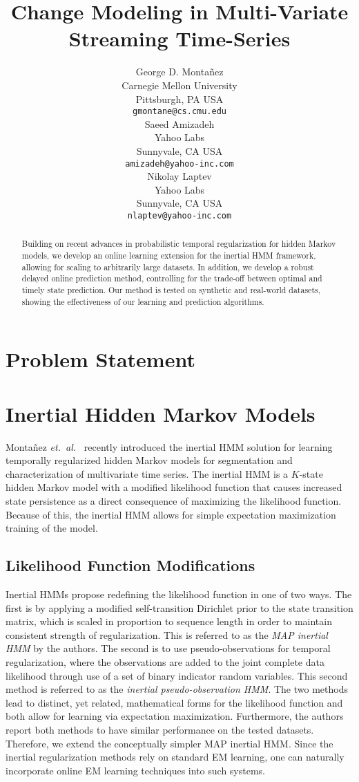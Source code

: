 \documentclass{article}
\title{Change Modeling in Multi-Variate Streaming Time-Series}
\author{George D. Monta\~nez \\
Carnegie Mellon University\\
Pittsburgh, PA USA\\
\texttt{gmontane@cs.cmu.edu} \\
\And
Saeed Amizadeh\\
Yahoo Labs\\
Sunnyvale, CA USA\\
\texttt{amizadeh@yahoo-inc.com}\\
\And
Nikolay Laptev\\
Yahoo Labs\\
Sunnyvale, CA USA\\
\texttt{nlaptev@yahoo-inc.com}}
\begin{document}
\maketitle

\begin{abstract}
Building on recent advances in probabilistic temporal regularization for hidden Markov models, we develop an online learning extension for the inertial HMM framework, allowing for scaling to arbitrarily large datasets. In addition, we develop a robust delayed online prediction method, controlling for the trade-off between optimal and timely state prediction. Our method is tested on synthetic and real-world datasets, showing the effectiveness of our learning and prediction algorithms.
\end{abstract}



\section{Problem Statement}

\section{Inertial Hidden Markov Models}

Monta\~nez \emph{et.\ al.}~ recently introduced the inertial HMM solution for learning temporally regularized hidden Markov models for segmentation and characterization of multivariate time series. The inertial HMM is a $K$-state hidden Markov model with a modified likelihood function that causes increased state persistence as a direct consequence of maximizing the likelihood function. Because of this, the inertial HMM allows for simple expectation maximization~\cite{dempster1977maximum} training of the model.

\subsection{Likelihood Function Modifications}
Inertial HMMs propose redefining the likelihood function in one of two ways. The first is by applying a modified self-transition Dirichlet prior to the state transition matrix, which is scaled in proportion to sequence length in order to maintain consistent strength of regularization. This is referred to as the \emph{MAP inertial HMM} by the authors. The second is to use pseudo-observations for temporal regularization, where the observations are added to the joint complete data likelihood through use of a set of binary indicator random variables. This second method is referred to as the \emph{inertial pseudo-observation HMM}. The two methods lead to distinct, yet related, mathematical forms for the likelihood function and both allow for learning via expectation maximization. Furthermore, the authors report both methods to have similar performance on the tested datasets. Therefore, we extend the conceptually simpler MAP inertial HMM. Since the inertial regularization methods rely on standard EM learning, one can naturally incorporate online EM learning techniques into such systems.
\end{document}
